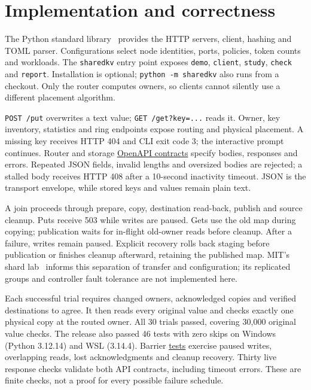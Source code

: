 \documentclass[12pt,a4paper]{article}
\newcommand{\detail}[2]{\href{https://github.com/Nvb-flipped/shared-kv-storage/blob/3f5da8a06de57b4e222b7b551b1a55b96c4cbadf/#1}{#2}}
\begin{document}
\newpage
\section{Implementation and correctness}
The Python standard library~\cite{python} provides the HTTP servers, client, hashing and TOML
parser. Configurations select node identities, ports, policies, token counts and
workloads. The \texttt{sharedkv} entry point exposes \texttt{demo}, \texttt{client},
\texttt{study}, \texttt{check} and \texttt{report}. Installation is optional;
\texttt{python -m sharedkv} also runs from a checkout. Only the router computes
owners, so clients cannot silently use a different placement algorithm.

\texttt{POST /put} overwrites a text value; \texttt{GET /get?key=...} reads it.
Owner, key inventory, statistics and ring endpoints expose routing and physical
placement. A missing key receives HTTP 404 and CLI exit code 3; the interactive
prompt continues. Router and storage \detail{docs/api.md}{OpenAPI contracts} specify bodies, responses
and errors. Repeated JSON fields, invalid lengths and oversized bodies are
rejected; a stalled body receives HTTP 408 after a 10-second inactivity timeout.
JSON is the transport envelope, while stored keys and values remain plain text.

A join proceeds through prepare, copy, destination read-back, publish and source
cleanup. Puts receive 503 while writes are paused. Gets use the old map during
copying; publication waits for in-flight old-owner reads before cleanup. After a
failure, writes remain paused. Explicit recovery rolls back staging before
publication or finishes cleanup afterward, retaining the published map.
MIT's shard lab~\cite{mit}
informs this separation of transfer and configuration; its replicated groups and
controller fault tolerance are not implemented here.

Each successful trial requires changed owners, acknowledged copies and verified
destinations to agree. It then reads every original value and checks exactly one
physical copy at the routed owner. All 30 trials passed, covering 30,000 original
value checks. The release also passed 46 tests with zero skips on Windows
(Python 3.12.14) and WSL (3.14.4). Barrier \href{https://github.com/Nvb-flipped/shared-kv-storage/tree/3f5da8a06de57b4e222b7b551b1a55b96c4cbadf/tests}{tests} exercise paused writes, overlapping
reads, lost acknowledgments and cleanup recovery. Thirty live response checks
validate both API contracts, including timeout errors. These are finite checks,
not a proof for every possible failure schedule.
\end{document}

